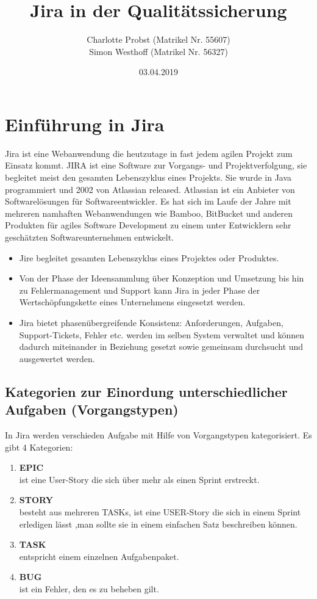 \documentclass[a4paper, 10pt]{scrartcl}
\title{Jira in der Qualitätssicherung}
\author{Charlotte Probst (Matrikel Nr. 55607)\\
 Simon Westhoff (Matrikel Nr. 56327)}
\date{03.04.2019}
\begin{document}
\maketitle


\newpage

\tableofcontents

\newpage

\section{Einführung in Jira}
Jira ist eine Webanwendung die heutzutage in fast jedem agilen Projekt zum Einsatz kommt. JIRA ist eine Software zur Vorgangs- und Projektverfolgung, sie begleitet meist den gesamten Lebenszyklus eines Projekts. Sie wurde in Java programmiert und 2002 von Atlassian released. Atlassian ist ein Anbieter von Softwarelösungen für Softwareentwickler. Es hat sich im Laufe der Jahre mit mehreren namhaften Webanwendungen wie Bamboo, BitBucket und anderen Produkten für agiles Software Development zu einem unter Entwicklern sehr geschätzten Softwareunternehmen entwickelt.
\begin{itemize}
\item Jire begleitet gesamten Lebenszyklus eines Projektes oder Produktes.
\item Von der Phase der Ideensammlung über Konzeption und Umsetzung bis hin zu Fehlermanagement und Support kann Jira in jeder Phase der Wertschöpfungskette eines Unternehmens eingesetzt werden.
\item Jira bietet phasenübergreifende Konsistenz: Anforderungen, Aufgaben, Support-Tickets, Fehler etc. werden im selben System verwaltet und können dadurch miteinander in Beziehung gesetzt sowie gemeinsam durchsucht und ausgewertet werden.
\end{itemize}

\subsection{Kategorien zur Einordung unterschiedlicher Aufgaben (Vorgangstypen)}
In Jira werden verschieden Aufgabe mit Hilfe von Vorgangstypen kategorisiert. Es gibt 4 Kategorien:
\begin{enumerate}
\item \textbf{EPIC}\\
ist eine User-Story die sich über mehr als einen Sprint erstreckt.
\item \textbf{STORY}\\
besteht aus mehreren TASKs, ist eine USER-Story die sich in einem Sprint erledigen lässt ,man sollte sie in einem einfachen Satz beschreiben können.
\item \textbf{TASK}\\
entspricht einem einzelnen Aufgabenpaket.
\item \textbf{BUG}\\
ist ein Fehler, den es zu beheben gilt.
\end{enumerate}
\end{document}
